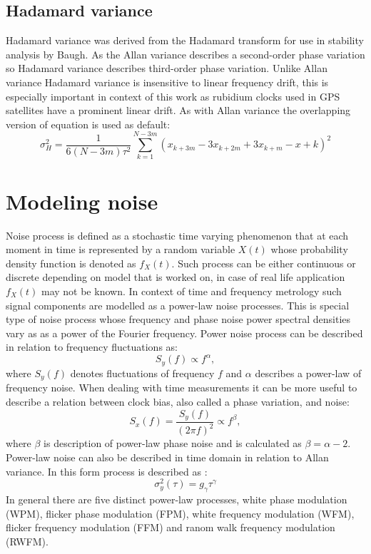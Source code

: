 \subsection{Hadamard variance}
Hadamard variance was derived from the Hadamard transform for use in stability analysis by 
Baugh.  As the Allan variance describes a second-order phase variation so Hadamard variance 
describes third-order phase variation.
Unlike Allan variance Hadamard variance is insensitive to linear frequency drift, this is 
especially important in context of this work as rubidium clocks used in GPS satellites have a 
prominent linear drift.
As with Allan variance the overlapping version of equation is used as default:
\begin{equation}
	\label{equ:overlapping_hadamard}
	\sigma^{2}_{H} = \frac{1}{6(N-3m)\tau^2}
	\sum^{N-3m}_{k=1}(x_{k+3m}-3x_{k+2m}+3x_{k+m}-x+{k})^{2}
\end{equation}

\section{Modeling noise}
Noise process is defined as a stochastic time varying phenomenon that at each moment in time is
represented by a random variable $X(t)$ whose probability density function is denoted as $f_{X}(t)$.
Such process can be either continuous or discrete depending on model that is worked on, in case 
of real life application $f_{X}(t)$ may not be known.
In context of time and frequency metrology such signal components are modelled as a power-law
noise processes. This is special type of noise process whose frequency and phase noise power 
spectral densities vary as as a power of the Fourier frequency.
Power noise process can be described in relation to frequency fluctuations as:
\begin{equation}
	\label{equ:power_noise_freq}
	S_{y}(f) \propto f^{\alpha},
\end{equation}
where $S_{y}(f)$ denotes fluctuations of frequency $f$ and $\alpha$ describes a power-law of
frequency noise.
When dealing with time measurements it can be more useful to describe a relation between clock 
bias, also called a phase variation, and noise:
\begin{equation}
	\label{equ:power_noise_phase}
	S_{x}(f)=\frac{S_{y}(f)}{(2\pi f)^2} \propto f^{\beta},
\end{equation}
where $\beta$ is description of power-law phase noise and is calculated as $\beta=\alpha-2$.
Power-law noise can also be described in time domain in relation to Allan variance.
In this form process is described as :
\begin{equation}
	\label{equ:power_noise_time}
	\sigma^{2}_{y}(\tau)=g_{\gamma}\tau^{\gamma}
\end{equation}
In general there are five distinct power-law processes, white phase modulation (WPM), flicker 
phase modulation (FPM), white frequency modulation (WFM), flicker frequency modulation (FFM) and
ranom walk frequency modulation (RWFM).

